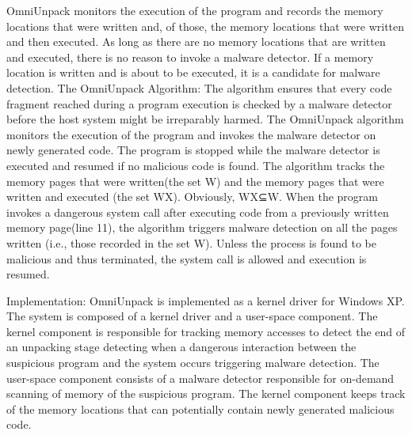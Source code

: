 \documentclass[11pt]{article}
\begin{document}
		OmniUnpack monitors the execution of the program and records the memory locations that were written and, of those, the memory locations that were written and then executed. As long as there are no memory locations that are written and executed, there is no reason to invoke a malware detector. If a memory location is written and is about to be executed, it is a candidate for malware detection.
		The OmniUnpack Algorithm:	
			The algorithm ensures that every code fragment reached during a program execution is checked by a malware detector before the host system might be irreparably harmed. The OmniUnpack algorithm monitors the execution of the program and invokes the malware detector on newly generated code. The program is stopped while the malware detector is executed and resumed if no malicious code is found.
			The algorithm tracks the memory pages that were written(the set W) and the memory pages that were written and executed (the set WX). Obviously, WX⊆W. When the program invokes a dangerous system call after executing code from a previously written memory page(line 11), the algorithm triggers malware detection on all the pages written (i.e., those recorded in the set W). Unless the process is found to be malicious and thus terminated, the system call is allowed and execution is resumed.

		Implementation:
		OmniUnpack is implemented as a kernel driver for Windows XP.
		The system is composed of a kernel driver and a user-space component. The kernel component is responsible for tracking memory accesses to detect the end of an unpacking stage detecting when a dangerous interaction between the suspicious program and the system occurs triggering malware detection. The user-space component consists of a malware detector responsible for on-demand scanning of memory of the suspicious program. The kernel component keeps track of the memory locations that can potentially contain newly generated malicious code.
\end{document}
